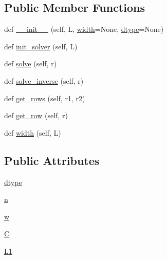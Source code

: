 \subsection*{Public Member Functions}
\begin{DoxyCompactItemize}
\item 
def \hyperlink{classnetworkx_1_1algorithms_1_1centrality_1_1flow__matrix_1_1InverseLaplacian_a4b2c5443e7935bbea32a403078dbe0d1}{\+\_\+\+\_\+init\+\_\+\+\_\+} (self, L, \hyperlink{classnetworkx_1_1algorithms_1_1centrality_1_1flow__matrix_1_1InverseLaplacian_a4c07b29a038b35fa80cdb408a185c8d2}{width}=None, \hyperlink{classnetworkx_1_1algorithms_1_1centrality_1_1flow__matrix_1_1InverseLaplacian_ab95e81fee0358b2829b32581399f2d6e}{dtype}=None)
\item 
def \hyperlink{classnetworkx_1_1algorithms_1_1centrality_1_1flow__matrix_1_1InverseLaplacian_a584ee88277930606d9679805cb7481d8}{init\+\_\+solver} (self, L)
\item 
def \hyperlink{classnetworkx_1_1algorithms_1_1centrality_1_1flow__matrix_1_1InverseLaplacian_a0fca9299cc52098c0b54b7de8c57402f}{solve} (self, r)
\item 
def \hyperlink{classnetworkx_1_1algorithms_1_1centrality_1_1flow__matrix_1_1InverseLaplacian_a8044b312f95415ec1d6e6b25e0f2729a}{solve\+\_\+inverse} (self, r)
\item 
def \hyperlink{classnetworkx_1_1algorithms_1_1centrality_1_1flow__matrix_1_1InverseLaplacian_a7d03c77d6bf3ff9e4346d1e986c9738b}{get\+\_\+rows} (self, r1, r2)
\item 
def \hyperlink{classnetworkx_1_1algorithms_1_1centrality_1_1flow__matrix_1_1InverseLaplacian_ad3390c339a4eb0405f57829f700cafca}{get\+\_\+row} (self, r)
\item 
def \hyperlink{classnetworkx_1_1algorithms_1_1centrality_1_1flow__matrix_1_1InverseLaplacian_a4c07b29a038b35fa80cdb408a185c8d2}{width} (self, L)
\end{DoxyCompactItemize}
\subsection*{Public Attributes}
\begin{DoxyCompactItemize}
\item 
\hyperlink{classnetworkx_1_1algorithms_1_1centrality_1_1flow__matrix_1_1InverseLaplacian_ab95e81fee0358b2829b32581399f2d6e}{dtype}
\item 
\hyperlink{classnetworkx_1_1algorithms_1_1centrality_1_1flow__matrix_1_1InverseLaplacian_af5e053cc20199ca601b252a83c421325}{n}
\item 
\hyperlink{classnetworkx_1_1algorithms_1_1centrality_1_1flow__matrix_1_1InverseLaplacian_ad3e32183ad4e19528ee9d4fe73fb0b07}{w}
\item 
\hyperlink{classnetworkx_1_1algorithms_1_1centrality_1_1flow__matrix_1_1InverseLaplacian_a255dd133058374940a7fbffb14282887}{C}
\item 
\hyperlink{classnetworkx_1_1algorithms_1_1centrality_1_1flow__matrix_1_1InverseLaplacian_a9d75111b5b498b9a24ffb5c4b9b9826a}{L1}
\end{DoxyCompactItemize}


